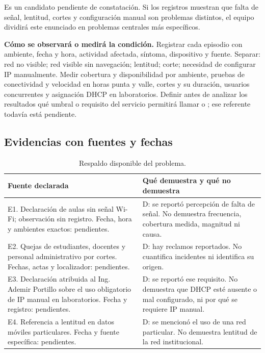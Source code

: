 	Es un candidato pendiente de constatación. Si los registros muestran que falta de señal, lentitud, cortes y configuración manual son problemas distintos, el equipo dividirá este enunciado en problemas centrales más específicos.

	\textbf{Cómo se observará o medirá la condición.} Registrar cada episodio con ambiente, fecha y hora, actividad afectada, síntoma, dispositivo y fuente. Separar: red no visible; red visible sin navegación; lentitud; corte; necesidad de configurar IP manualmente. Medir cobertura y disponibilidad por ambiente, pruebas de conectividad y velocidad en horas punta y valle, cortes y su duración, usuarios concurrentes y asignación DHCP en laboratorios. Definir antes de analizar los resultados qué umbral o requisito del servicio permitirá llamar  o ; ese referente todavía está pendiente.

\subsection{Evidencias con fuentes y fechas}

	\begin{table}[H]
		\centering
		\caption{Respaldo disponible del problema.}
		\begin{tabular}{T{6.4cm}T{8.4cm}}
			\hline
			\textbf{Fuente declarada} & \textbf{Qué demuestra y qué no demuestra} \bigstrut\\
			\hline
			E1. Declaración de aulas sin señal Wi-Fi; observación sin registro. Fecha, hora y ambientes exactos: pendientes. & D: se reportó percepción de falta de señal. No demuestra frecuencia, cobertura medida, magnitud ni causa. \\
			E2. Quejas de estudiantes, docentes y personal administrativo por cortes. Fechas, actas y localizador: pendientes. & D: hay reclamos reportados. No cuantifica incidentes ni identifica su origen. \\
			E3. Declaración atribuida al Ing. Ademir Portillo sobre el uso obligatorio de IP manual en laboratorios. Fecha y registro: pendientes. & D: se reportó ese requisito. No demuestra que DHCP esté ausente o mal configurado, ni por qué se requiere IP manual. \\
			E4. Referencia a lentitud en datos móviles particulares. Fecha y fuente específica: pendientes. & D: se mencionó el uso de una red particular. No demuestra lentitud de la red institucional. \\
			\hline
		\end{tabular}
		\label{tab:evidencias}
	\end{table}

